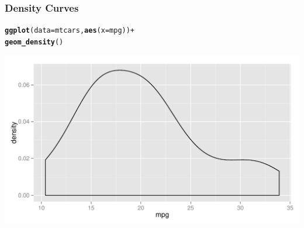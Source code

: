 \documentclass[12pt]{beamer}\usepackage[]{graphicx}\usepackage[]{color}
\makeatletter
\newcommand{\hlopt}[1]{\textcolor[rgb]{0,0,0}{#1}}%
\newcommand{\hlstd}[1]{\textcolor[rgb]{0.345,0.345,0.345}{#1}}%
\newcommand{\hlkwc}[1]{\textcolor[rgb]{0.333,0.667,0.333}{#1}}%
\newcommand{\hlkwd}[1]{\textcolor[rgb]{0.737,0.353,0.396}{\textbf{#1}}}%
\newenvironment{kframe}{%
 \def\at@end@of@kframe{}%
 \ifinner\ifhmode%
  \def\at@end@of@kframe{\end{minipage}}%
  \begin{minipage}{\columnwidth}%
 \fi\fi%
 \def\FrameCommand##1{\hskip\@totalleftmargin \hskip-\fboxsep
 \colorbox{shadecolor}{##1}\hskip-\fboxsep
     \hskip-\linewidth \hskip-\@totalleftmargin \hskip\columnwidth}%
 \MakeFramed {\advance\hsize-\width
   \@totalleftmargin\z@ \linewidth\hsize
   \@setminipage}}%
 {\par\unskip\endMakeFramed%
 \at@end@of@kframe}
\newenvironment{knitrout}{}{} %
\makeatother
\begin{document}
\begin{frame}[fragile]
\frametitle{Density Curves}

\begin{knitrout}\scriptsize
{}\color{fgcolor}\begin{kframe}
\begin{alltt}
\hlkwd{ggplot}\hlstd{(}\hlkwc{data} \hlstd{= mtcars,} \hlkwd{aes}\hlstd{(}\hlkwc{x} \hlstd{= mpg))} \hlopt{+}
  \hlkwd{geom_density}\hlstd{()}
\end{alltt}
\end{kframe}

{\centering \includegraphics[width=.9\linewidth,height=.5\linewidth]{figure/unnamed-chunk-8-1} 

}



\end{knitrout}

\end{frame}

\end{document}
